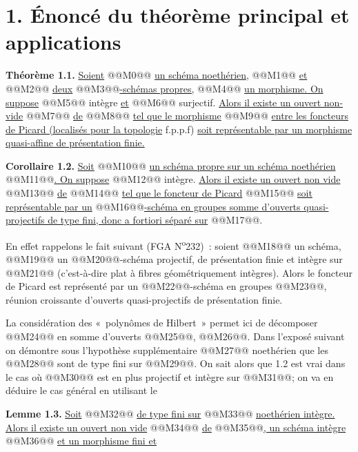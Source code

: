 
\section*{1. Énoncé du théorème principal et applications}

\textbf{Théorème 1.1.} \uline{Soient} @@M0@@ \uline{un schéma noethérien,} @@M1@@ \uline{et} @@M2@@ \uline{deux} @@M3@@\uline{-schémas propres,} @@M4@@ \uline{un morphisme. On suppose} @@M5@@ intègre \uline{et} @@M6@@ surjectif. \uline{Alors il existe un ouvert non-vide} @@M7@@ \uline{de} @@M8@@ \uline{tel que le morphisme}
@@M9@@
\uline{entre les foncteurs de Picard (localisés pour la topologie} f.p.p.f) \uline{soit représentable par un morphisme quasi-affine de présentation finie.}

\textbf{Corollaire 1.2.} \uline{Soit} @@M10@@ \uline{un schéma propre sur un schéma noethérien} @@M11@@\uline{. On suppose} @@M12@@ intègre. \uline{Alors il existe un ouvert non vide} @@M13@@ \uline{de} @@M14@@ \uline{tel que le foncteur de Picard} @@M15@@ \uline{soit représentable par un} @@M16@@\uline{-schéma en groupes somme d'ouverts quasi-projectifs de type fini, donc a fortiori séparé sur} @@M17@@.

En effet rappelons le fait suivant (FGA N\textsuperscript{o}232)~: soient @@M18@@ un schéma, @@M19@@ un @@M20@@-schéma projectif, de présentation finie et intègre sur @@M21@@ (c'est-à-dire plat à fibres géométriquement intègres). Alors le foncteur de Picard est représenté par un @@M22@@-schéma en groupes @@M23@@, réunion croissante d'ouverts quasi-projectifs de présentation finie.

La considération des «~polynômes de Hilbert~» permet ici de décomposer @@M24@@ en somme d'ouverts @@M25@@, @@M26@@. Dans l'exposé suivant on démontre sous l'hypothèse supplémentaire @@M27@@ noethérien que les @@M28@@ sont de type fini sur @@M29@@. On sait alors que 1.2 est vrai dans le cas où @@M30@@ est en plus projectif et intègre sur @@M31@@; on va en déduire le cas général en utilisant le

\textbf{Lemme 1.3.} \uline{Soit} @@M32@@ \uline{de type fini sur} @@M33@@ \uline{noethérien intègre. Alors il existe un ouvert non vide} @@M34@@ \uline{de} @@M35@@\uline{, un schéma intègre} @@M36@@ \uline{et un morphisme fini et}
